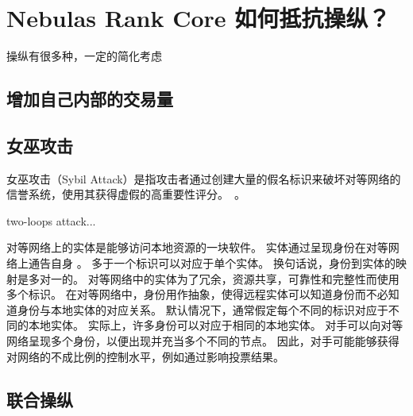 
\section{Nebulas Rank Core 如何抵抗操纵？}
操纵有很多种，一定的简化考虑

\subsection{增加自己内部的交易量}
\subsection{女巫攻击}
女巫攻击（Sybil Attack）是指攻击者通过创建大量的假名标识来破坏对等网络的信誉系统，使用其获得虚假的高重要性评分。~\cite{quercia2010sybil}。

two-loops attack...


对等网络上的实体是能够访问本地资源的一块软件。 实体通过呈现身份在对等网络上通告自身 。 多于一个标识可以对应于单个实体。 
换句话说，身份到实体的映射是多对一的。 对等网络中的实体为了冗余，资源共享，可靠性和完整性而使用多个标识。 
在对等网络中，身份用作抽象，使得远程实体可以知道身份而不必知道身份与本地实体的对应关系。 
默认情况下，通常假定每个不同的标识对应于不同的本地实体。 实际上，许多身份可以对应于相同的本地实体。 
对手可以向对等网络呈现多个身份，以便出现并充当多个不同的节点。 因此，对手可能能够获得对网络的不成比例的控制水平，例如通过影响投票结果。 
\subsection{联合操纵}
